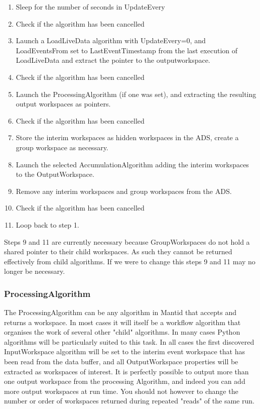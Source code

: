\begin{enumerate}
\item Sleep for the number of seconds in UpdateEvery
\item Check if the algorithm has been cancelled
\item Launch a LoadLiveData algorithm with UpdateEvery=0, and LoadEventsFrom set to LastEventTimestamp from the last execution of LoadLiveData and extract the pointer to the outputworkspace.
\item Check if the algorithm has been cancelled
\item Launch the ProcessingAlgorithm (if one was set), and extracting the resulting output workspaces as pointers.
\item Check if the algorithm has been cancelled
\item Store the interim workspaces as hidden workspaces in the ADS, create a group workspace as necessary.
\item Launch the selected AccumulationAlgorithm adding the interim workspaces to the OutputWorkspace.
\item Remove any interim workspaces and group workspaces from the ADS.
\item Check if the algorithm has been cancelled
\item Loop back to step 1.
\end{enumerate}


Steps 9 and 11 are currently necessary because GroupWorkspaces do not hold a shared pointer to their child workspaces.  As such they cannot be returned effectively from child algorithms.  If we were to change this steps 9 and 11 may no longer be necessary.



\subsubsection{ProcessingAlgorithm}
The ProcessingAlgorithm can be any algorithm in Mantid that accepts and returns a workspace.  In most cases it will itself be a workflow algorithm that organises the work of several other "child" algorithms.  In many cases Python algorithms will be particularly suited to this task.  In all cases the first discovered InputWorkspace algorithm will be set to the interim event workspace that has been read from the data buffer, and all OutputWorkspace properties will be extracted as workspaces of interest.
It is perfectly possible to output more than one output workspace from the processing Algorithm, and indeed you can add more output workspaces at run time.  You should not however to change the number or order of workspaces returned during repeated "reads" of the same run.


